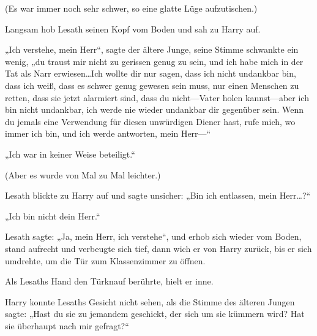 (Es war immer noch sehr schwer, so eine glatte Lüge aufzutischen.)

Langsam hob Lesath seinen Kopf vom Boden und sah zu Harry auf.

„Ich verstehe, mein Herr“, sagte der ältere Junge, seine Stimme schwankte ein wenig, „du traust mir nicht zu gerissen genug zu sein, und ich habe mich in der Tat als Narr erwiesen…Ich wollte dir nur sagen, dass ich nicht undankbar bin, dass ich weiß, dass es schwer genug gewesen sein muss, nur einen Menschen zu retten, dass sie jetzt alarmiert sind, dass du nicht—Vater holen kannst—aber ich bin nicht undankbar, ich werde nie wieder undankbar dir gegenüber sein. Wenn du jemals eine Verwendung für diesen unwürdigen Diener hast, rufe mich, wo immer ich bin, und ich werde antworten, mein Herr—“

„Ich war in keiner Weise beteiligt.“

(Aber es wurde von Mal zu Mal leichter.)

Lesath blickte zu Harry auf und sagte unsicher: „Bin ich entlassen, mein Herr…?“

„Ich bin nicht dein Herr.“

Lesath sagte: „Ja, mein Herr, ich verstehe“, und erhob sich wieder vom Boden, stand aufrecht und verbeugte sich tief, dann wich er von Harry zurück, bis er sich umdrehte, um die Tür zum Klassenzimmer zu öffnen.

Als Lesaths Hand den Türknauf berührte, hielt er inne.

Harry konnte Lesaths Gesicht nicht sehen, als die Stimme des älteren Jungen sagte: „Hast du sie zu jemandem geschickt, der sich um sie kümmern wird? Hat sie überhaupt nach mir gefragt?“

